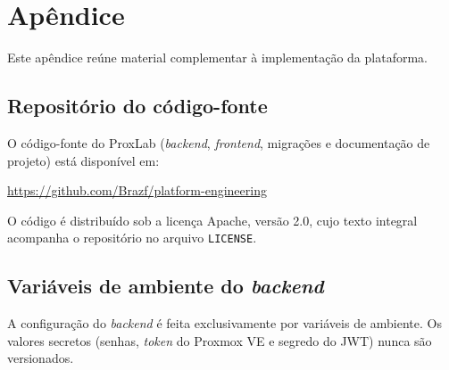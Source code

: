 \chapter{Apêndice}
\label{apendice:material}

Este apêndice reúne material complementar à implementação da plataforma.

\section{Repositório do código-fonte}

O código-fonte do ProxLab (\textit{backend}, \textit{frontend}, migrações e documentação de projeto) está disponível em:

\begin{center}
    \url{https://github.com/Brazf/platform-engineering}
\end{center}

\par O código é distribuído sob a licença Apache, versão 2.0, cujo texto integral acompanha o repositório no arquivo \texttt{LICENSE}.

\section{Variáveis de ambiente do \textit{backend}}

A configuração do \textit{backend} é feita exclusivamente por variáveis de ambiente. Os valores secretos (senhas, \textit{token} do Proxmox VE e segredo do JWT) nunca são versionados.

